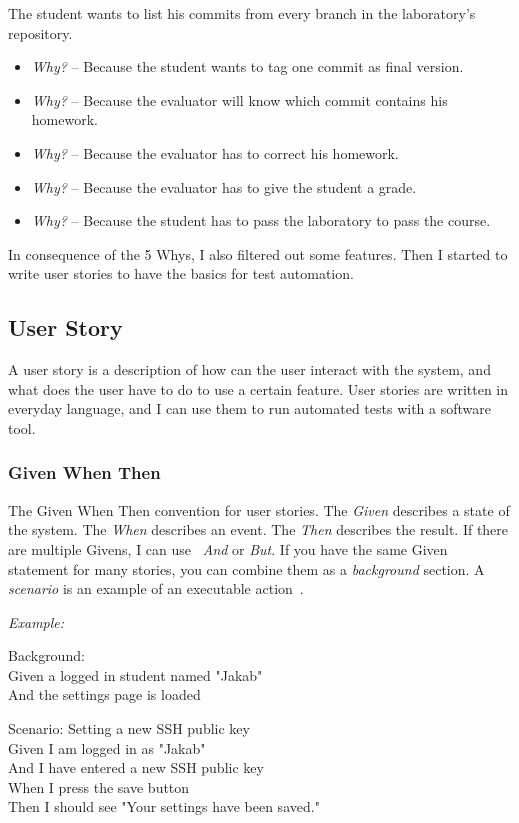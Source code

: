 The student wants to list his commits from every branch in the laboratory's repository.
\begin{itemize}
	\item \emph{Why?} -- Because the student wants to tag one commit as final version.
	\item \emph{Why?} -- Because the evaluator will know which commit contains his homework.
	\item \emph{Why?} -- Because the evaluator has to correct his homework.
	\item \emph{Why?} -- Because the evaluator has to give the student a grade.
	\item \emph{Why?} -- Because the student has to pass the laboratory to pass the course.
\end{itemize}

In consequence of the 5 Whys, I also filtered out some features. Then I started to write user stories to have the basics for test automation.

\subsection{User Story}
A user story is a description of how can the user interact with the system, and what does the user have to do to use a certain feature. User stories are written in everyday language, and I can use them to run automated tests with a software tool. 

\subsubsection{Given When Then}

The Given When Then convention for user stories. The \emph{Given} describes a state of the system. The \emph{When} describes an event. The \emph{Then} describes the result. If there are multiple Givens, I can use ~\emph{And} or \emph{But}. If you have the same Given statement for many stories, you can combine them as a \emph{background} section. A \emph{scenario} is an example of an executable action~\cite{Cucumber-scenario}. 

\emph{Example:}

Background:\\ \hspace*{1cm}
Given a logged in student named "Jakab"\\ \hspace*{1cm}
And the settings page is loaded

Scenario: Setting a new SSH public key\\ \hspace*{1cm}
Given I am logged in as "Jakab"\\ \hspace*{1cm}
And I have entered a new SSH public key\\ \hspace*{1cm}
When I press the save button\\ \hspace*{1cm}
Then I should see "Your settings have been saved."

